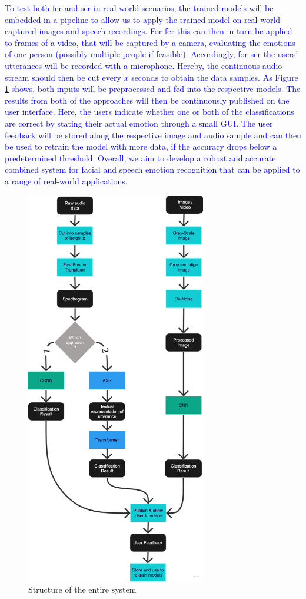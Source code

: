 \textcolor{blue}{To test both \acrshort{fer} and \acrshort{ser} in real-world scenarios, the trained models will be embedded in a pipeline to allow us to apply the trained model on real-world captured images and speech recordings. For \acrshort{fer} this can then in turn be applied to frames of a video, that will be captured by a camera, evaluating the emotions of one person (possibly multiple people if feasible). Accordingly, for \acrshort{ser} the users' utterances will be recorded with a microphone. Hereby, the continuous audio stream should then be cut every $x$ seconds to obtain the data samples. As Figure \ref{fig:whole-system} shows, both inputs will be preprocessed and fed into the respective models. The results from both of the approaches will then be continuously published on the user interface. Here, the users indicate whether one or both of the classifications are correct by stating their actual emotion through a small GUI. The user feedback will be stored along the respective image and audio sample and can then be used to retrain the model with more data, if the accuracy drops below a predetermined threshold. Overall, we aim to develop a robust and accurate combined system for facial and speech emotion recognition that can be applied to a range of real-world applications.}

\begin{figure}[h]
\centering
\includegraphics[width=0.7\textwidth]{images/whole-system.png}
\caption{Structure of the entire system}\label{fig:whole-system}
\end{figure}
